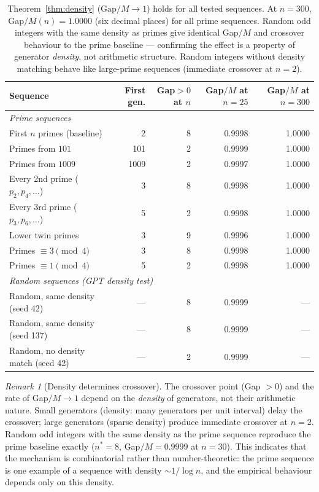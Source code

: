 \documentclass[11pt,a4paper]{amsart}
\theoremstyle{plain}
\theoremstyle{definition}
\theoremstyle{remark}
\newtheorem{remark}[theorem]{Remark}
\begin{document}
\begin{table}[H]
\centering
\small
\begin{tabular}{lrrrr}
\hline
Sequence & First gen. & Gap$>0$ at $n$ & Gap$/M$ at $n=25$ & Gap$/M$ at $n=300$ \\
\hline
\multicolumn{5}{l}{\textit{Prime sequences}} \\
First $n$ primes (baseline)        &    2 & 8 & 0.9998 & 1.0000 \\
Primes from $101$                  &  101 & 2 & 0.9999 & 1.0000 \\
Primes from $1009$                 & 1009 & 2 & 0.9997 & 1.0000 \\
Every 2nd prime ($p_2,p_4,\ldots$) &    3 & 8 & 0.9998 & 1.0000 \\
Every 3rd prime ($p_3,p_6,\ldots$) &    5 & 2 & 0.9998 & 1.0000 \\
Lower twin primes                  &    3 & 9 & 0.9996 & 1.0000 \\
Primes $\equiv 3\pmod{4}$          &    3 & 8 & 0.9998 & 1.0000 \\
Primes $\equiv 1\pmod{4}$          &    5 & 2 & 0.9998 & 1.0000 \\
\multicolumn{5}{l}{\textit{Random sequences (GPT density test)}} \\
Random, same density (seed 42)     &  --- & 8 & 0.9999 & --- \\
Random, same density (seed 137)    &  --- & 8 & 0.9999 & --- \\
Random, no density match (seed 42) &  --- & 2 & 0.9999 & --- \\
\hline
\end{tabular}
\caption{Theorem~\ref{thm:density} ($\mathrm{Gap}/M \to 1$)
holds for all tested sequences.
At $n=300$, Gap$/M(n) = 1.0000$ (six decimal places) for all prime sequences.
Random odd integers with the same density as primes give identical
Gap$/M$ and crossover behaviour to the prime baseline ---
confirming the effect is a property of generator \emph{density},
not arithmetic structure.
Random integers without density matching behave like large-prime sequences
(immediate crossover at $n=2$).}
\label{tab:sequences}
\end{table}

\begin{remark}[Density determines crossover]
The crossover point (Gap $> 0$) and the rate of Gap$/M \to 1$
depend on the \emph{density} of generators, not their arithmetic nature.
Small generators (density: many generators per unit interval) delay
the crossover; large generators (sparse density) produce immediate
crossover at $n=2$.
Random odd integers with the same density as the prime sequence
reproduce the prime baseline exactly ($n^* = 8$, Gap$/M = 0.9999$ at $n=30$).
This indicates that the mechanism is combinatorial rather than
number-theoretic: the prime sequence is one example of a sequence
with density $\sim 1/\log n$, and the empirical behaviour depends only
on this density.
\end{remark}
\end{document}
